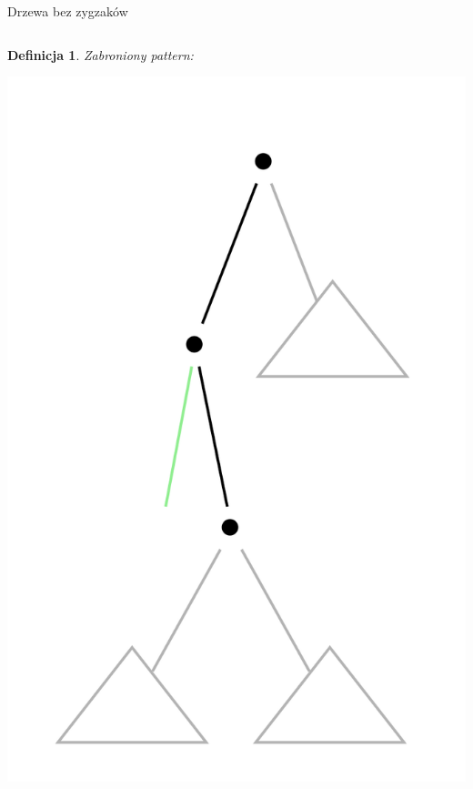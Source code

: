 \documentclass[final]{beamer}
\theoremstyle{bluetheorem}
\theoremstyle{bluetheorem}
\newtheorem{mydefinition}[mytheorem]{Definicja}
\theoremstyle{greentheorem}
\begin{document}
\begin{frame}{Drzewa bez zygzaków}
    \begin{columns}
        \begin{mydefinition}
            Zabroniony pattern:
            \begin{center}
                \includegraphics[height=\textwidth]{zigzag_forbid.png}
            \end{center}
        \end{mydefinition}


\end{columns}
\end{frame}
\end{document}
